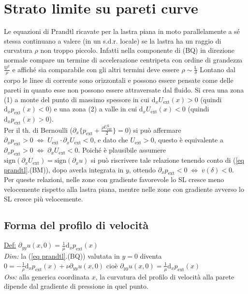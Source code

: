 \documentclass[11pt,a4paper]{report}
\newcommand{\de}{\mathrm d}
\newcommand{\sz}[1]{\scriptsize #1\normalsize}
\begin{document}
{	\section{Strato limite su pareti curve}
	Le equazioni di Prandtl ricavate per la lastra piana in moto parallelamente a sé stessa continuano a valere (in un s.d.r. locale) se la lastra ha un raggio di curvatura $\rho$ non troppo piccolo. Infatti nella componente di \sz{(BQ)} in direzione normale compare un termine di accelerazione centripeta con ordine di grandezza $\frac{\mathsf U^2}{\rho}$ e affiché sia comparabile con gli altri termini deve essere $\rho\sim\frac{\mathsf L}{\delta}$
	Lontano dal corpo le linee di corrente sono orizzontali e possono essere pensate come delle pareti in quanto esse non possono essere attraversate dal fluido. Si crea una zona (1) a monte del punto di massimo spessore in cui $\de _xU_\mathrm{ext}(x)>0$ (quindi $\de _xp_\mathrm{ext}(x)<0$) e una zona (2) a valle in cui $\de _xU_\mathrm{ext}(x)<0$ (quindi $\de _xp_\mathrm{ext}(x)>0$).\\
Per il th. di Bernoulli \big($\partial_x\{p_\mathrm{ext}+\frac{\rho U_\mathrm{ext}^2}{2}\}=0$\big) si può affermare $\partial_xp_\mathrm{ext}>0\;\Leftrightarrow\;U_\mathrm{ext}\!\cdot\!\partial_xU_\mathrm{ext}<0$, e dato che $U_\mathrm{ext}>0$, questo è equivalente a $\partial_xp_\mathrm{ext}>0\;\Leftrightarrow\;\partial_xU_\mathrm{ext}<0$. Poiché è plausibile assumere $\mathrm{sign}(\partial_xU_\mathrm{ext})=\mathrm{sign}(\partial_xu)$ si può riscrivere tale relazione tenendo conto di (\ref{eq prandtl}.\sz{(BM)}), dopo averla integrata in $y$, ottendo $\partial_xp_\mathrm{ext}<0\;\Leftrightarrow\;v(\delta)<0$.\\
Per queste relazioni, nelle zone con gradiente favorevole lo SL cresce meno velocemente rispetto alla lastra piana, mentre nelle zone con gradiente avverso lo SL cresce più velocemente.	
		\subsection{Forma del profilo di velocità}
		\underline{Def:} $\partial_{yy}u(x,0)=\frac 1\mu\de _xp_\mathrm{ext}(x)$\\
		\textit{Dim:} la (\ref{eq prandtl}.\sz{(BQ)}) valutata in $y=0$ diventa $0=-\frac 1\rho\de _xp_\mathrm{ext}(x)+\nu\partial_{yy}u(x,0)$ cioè $\partial_{yy}u(x,0)=\frac 1\mu\de _xp_\mathrm{ext}(x)$\\
		\textit{Oss:} alla generica coordinata $x$, la curvatura del profilo di velocità alla parete dipende dal gradiente di pressione in quel punto.
}
\end{document}
